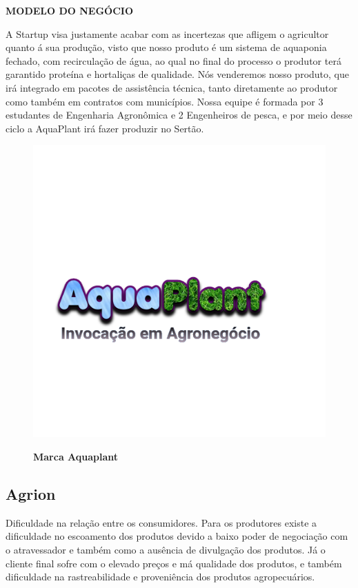 \textbf{MODELO DO NEGÓCIO}

A Startup visa justamente acabar com as incertezas que  afligem o agricultor quanto á sua produção, visto que nosso produto é um sistema de aquaponia fechado, com recirculação de água, ao qual no final do processo o produtor terá garantido proteína e hortaliças de qualidade. Nós venderemos nosso produto, que irá integrado em pacotes de assistência técnica, tanto diretamente ao produtor como também em contratos com municípios. Nossa equipe é formada por 3 estudantes de Engenharia Agronômica e 2 Engenheiros de pesca, e por meio desse ciclo a AquaPlant irá fazer produzir no Sertão.


\begin{figure}[!htb]
\centering
\caption{\textbf{Marca Aquaplant}}
\includegraphics[scale=0.4]{Imagens/aquaplant.png}
\label{figura_13}
\end{figure}
\newpage

\subsection{Agrion}

Dificuldade na relação entre os consumidores. Para os produtores existe a dificuldade no escoamento dos produtos devido a baixo poder de negociação com o atravessador e também como a ausência  de divulgação dos produtos. Já o cliente final sofre com o elevado preços e má qualidade dos produtos, e também dificuldade na rastreabilidade e proveniência dos produtos agropecuários.

